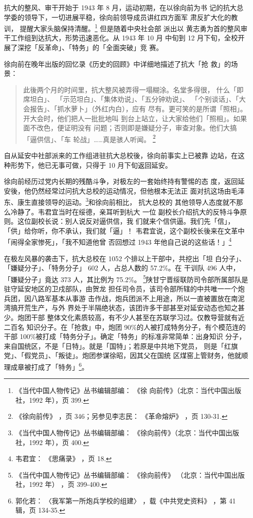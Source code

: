 抗大的整风、审干开始于 1943 年 8 月，运动初期，在以徐向前为书 记的抗大总
学委的领导下，一切进展平稳，徐向前领导成员讲红四方面军 肃反扩大化的教训，
提醒大家头脑保持清醒。\footnote{《当代中国人物传记》丛书编辑部编： 《徐
向前传》（北京：当代中国出版社，1992 年），页 399.} 但是随着中央社会部
派出以 黄志勇为首的整风审干工作组到达抗大，形势迅速恶化。从 1943 年 10
月 中旬到 12 月下旬，全校开展了深挖「反革命」、「特务」的「全面突破」竞
赛。

徐向前在晚年出版的回忆录《历史的回顾》中详细地描述了抗大「抢
救」的场景：
\begin{quote}
	\fzwkai 此後两个月的时间里，抗大整风被弄得一塌糊涂。名堂多得很，
什么「即席坦白」、
「示范坦白」、「集体劝说」、「五分钟劝说」、
「个别谈话」、「大会报告」、「抓水萝卜」（外红内白），应有
尽有。更可笑的是所谓「照相」。开大会时，他们把人一批批地叫
到台上站立，让大家给他们「照相」。如果面不改色，便证明没有
问题；否则即是嫌疑分子，审查对象。他们大搞「逼供信」、「车
轮战」……真是骇人听闻。
\footnote{《徐向前传》
，页 346；另参见李志民：
《革命熔炉》
，页 130-31.}
\end{quote}

自从延安中社部派来的工作组进驻抗大总校後，徐向前事实上已被靠
边站，在这种形势下，他已无事可做，只得于 10 月下旬返回延安。

徐向前经历过党内长期的残酷斗争，对极左的一套始终持有警惕的态 度，返回延
安後，他仍然经常过问抗大总校的运动情况，但他根本无法正 面对抗这场由毛泽
东、康生直接领导的运动。\footnote{《当代中国人物传记》丛书编辑部编：
《徐向前传》（北京：当代中国出版社，1992 年），页 400.}和徐向前相比，
抗大总校的 其他领导人态度就不那么冷静了。韦君宜当时在绥德，亲耳听到杭大
一位
副校长介绍抗大的反特斗争原则。这位副校长说：别人说反对逼供信，我
们就来个信供逼。我们先「信」，
「供」给你听，你不承认，我们就「逼」！
韦君宜说，这个副校长後来在文革中「闹得全家惨死」，「我不知道他曾
否回想过 1943 年他自己说的这些话！」\footnote{韦君宜：
《思痛录》
，页 18.}

在极左风暴的袭击下，抗大总校在 1052 个排以上干部中，共挖出「坦
白分子」、「嫌疑分子」、「特务分子」 602 人，占总人数的 57.2\%。在
干训队 496 人中，「嫌疑分子」竟达 373 人，其比例为 75.2\%。
\footnote{《当代中国人物传记》丛书编辑部编：
《徐向前传》
（北京：当代中国出版社，1992 年）
，页 399-400.}陕甘宁晋绥联防司令部所属部队是驻守延安地区的卫戍部队，由贺龙
担任司令员，该司令部所辖的中共唯一一个炮兵团，因八路军基本从事游
击作战，炮兵团派不上用途，所以一直被置放在南泥湾搞开荒生产，与外
界处于半隔绝状态，该团许多干部甚至对延安动态也知之甚少。炮团干部
整体文化素质较高，有不少人甚至在苏联学习过。仅教导营就有近二百名
知识分子。在「抢救」中，炮团 90\%的人被打成特务分子，有个模范连的
干部 100\%被打成「特务分子」。确定「特务」的标准非常简单：出身知识
分子，来自国统区，不是「日特」。就是「国特」；若原是中共地下党员，
则是「红旗党」、「假党员」、「叛徒」。炮团参谋徐昭，因其父在国统
区煤窑上管财务，他就顺理成章被打成了「特务」\footnote{郭化若：
〈我军第一所炮兵学校的组建〉
，载《中共党史资料》
，第 41 辑，页 134-35.}。

